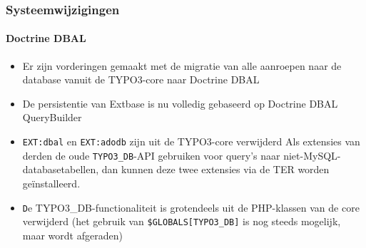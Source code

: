
\begin{frame}[fragile]
	\frametitle{Systeemwijzigingen}
	\framesubtitle{Doctrine DBAL}

	\begin{itemize}
		\item Er zijn vorderingen gemaakt met de migratie van alle aanroepen naar de database vanuit 
			de TYPO3-core naar Doctrine DBAL
		\item De persistentie van Extbase is nu volledig gebaseerd op Doctrine DBAL QueryBuilder
		\item \texttt{EXT:dbal} en \texttt{EXT:adodb} zijn uit de TYPO3-core verwijderd\newline
			\smaller
				Als extensies van derden de oude \texttt{TYPO3\_DB}-API gebruiken voor query's naar
				niet-MySQL-databasetabellen, dan kunnen deze twee extensies via de TER worden geïnstalleerd.
			\normalsize

		\item \texttt De {TYPO3\_DB}-functionaliteit is grotendeels uit de PHP-klassen van de core verwijderd\newline
			\smaller
				(het gebruik van \texttt{\$GLOBALS[TYPO3\_DB]} is nog steeds mogelijk, maar wordt afgeraden)
			\normalsize

	\end{itemize}

\end{frame}


